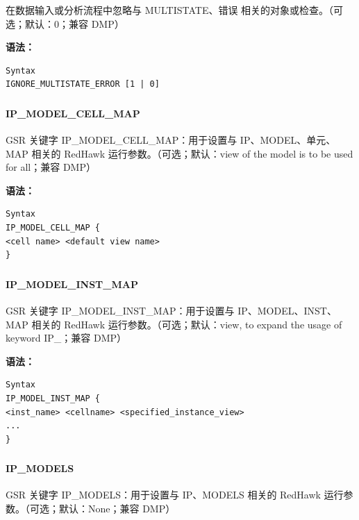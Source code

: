 在数据输入或分析流程中忽略与 MULTISTATE、错误 相关的对象或检查。（可选；默认：0；兼容 DMP）

\textbf{语法：}
\begin{lstlisting}
Syntax
IGNORE_MULTISTATE_ERROR [1 | 0]
\end{lstlisting}

\subsubsection{}
\paragraph*{IP_MODEL_CELL_MAP}

GSR 关键字 IP_MODEL_CELL_MAP：用于设置与 IP、MODEL、单元、MAP 相关的 RedHawk 运行参数。（可选；默认：view of the model is to be used for all；兼容 DMP）

\textbf{语法：}
\begin{lstlisting}
Syntax
IP_MODEL_CELL_MAP {
<cell name> <default view name>
}
\end{lstlisting}

\subsubsection{}
\paragraph*{IP_MODEL_INST_MAP}

GSR 关键字 IP_MODEL_INST_MAP：用于设置与 IP、MODEL、INST、MAP 相关的 RedHawk 运行参数。（可选；默认：view, to expand the usage of keyword IP_；兼容 DMP）

\textbf{语法：}
\begin{lstlisting}
Syntax
IP_MODEL_INST_MAP {
<inst_name> <cellname> <specified_instance_view>
...
}
\end{lstlisting}

\subsubsection{}
\paragraph*{IP_MODELS}

GSR 关键字 IP_MODELS：用于设置与 IP、MODELS 相关的 RedHawk 运行参数。（可选；默认：None；兼容 DMP）

